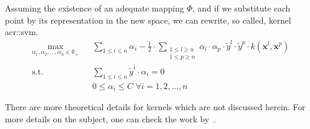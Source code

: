         Assuming the existence of an adequate mapping $\Phi$, and if we substitute each point by its representation in the new space, we can rewrite, so called, kernel \gls{acr::svm}.
        \begin{equation}
            \label{eq::kernel_soft_svm_dual}
            \begin{aligned}
                & \max_{\alpha_1, \alpha_2, \dots, \alpha_n \in \mathbb{R}_+}
                & & \sum_{1 \leq i \leq n} \alpha_i - \frac{1}{2}\cdot\sum_{\substack{1\leq l \geq n\\1\leq p \geq n}}\alpha_l\cdot\alpha_p\cdot\tilde{y}^l\cdot\tilde{y}^p\cdot k(\bm{x}^l, \bm{x}^p)\\
                &\text{s.t.} & & \sum_{1 \leq i \leq n}\tilde{y}^i\cdot\alpha_i=0 \\
                & & & 0 \leq \alpha_i \leq C \; \forall i = 1, 2, \dots, n
                \end{aligned}
        \end{equation}

        There are more theoretical details for kernels which are not discussed herein.
        For more details on the subject, one can check the work by~\textcite{aronszajn1950theory,shawe2004kernel,vapnik2013nature}.

